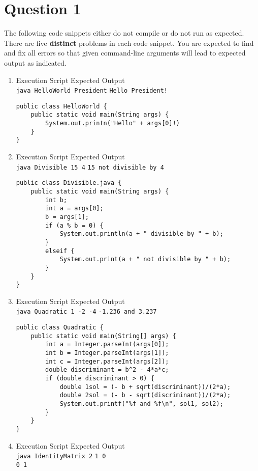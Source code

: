 \section*{Question 1}
The following code snippets either do not compile or do not run as expected. There are five \textbf{distinct} problems in each code snippet. You are expected to find and fix all errors so that given command-line arguments will lead to expected output as indicated.
\begin{enumerate}[label=\textbf{(\alph*)}]
\item Execution Script \hfill Expected Output\\
\texttt{java HelloWorld President} \hfill \texttt{Hello President!}
\begin{lstlisting}
public class HelloWorld {
	public static void main(String args) {
		System.out.printn("Hello" + args[0]!)
	}
}
\end{lstlisting}

\item Execution Script \hfill Expected Output\\
\texttt{java Divisible 15 4} \hfill \texttt{15 not divisible by 4}

\begin{lstlisting}
public class Divisible.java {
	public static void main(String args) {
		int b;
		int a = args[0];
		b = args[1];
		if (a % b = 0) {
			System.out.println(a + " divisible by " + b);
		}
		elseif {
			System.out.print(a + " not divisible by " + b);
		}
	}
}
\end{lstlisting}

\item Execution Script \hfill Expected Output\\
\texttt{java Quadratic 1 -2 -4} \hfill \texttt{-1.236 and 3.237}

\begin{lstlisting}
public class Quadratic {
	public static void main(String[] args) {
		int a = Integer.parseInt(args[0]);
		int b = Integer.parseInt(args[1]);
		int c = Integer.parseInt(args[2]);
		double discriminant = b^2 - 4*a*c;
		if (double discriminant > 0) {
			double 1sol = (- b + sqrt(discriminant))/(2*a);
			double 2sol = (- b - sqrt(discriminant))/(2*a);
			System.out.printf("%f and %f\n", sol1, sol2);
		}
	}
}
\end{lstlisting}

\item Execution Script \hfill Expected Output\\
\texttt{java IdentityMatrix 2} \hfill \texttt{1 0}\\ \raggedleft \texttt{0 1}


\end{enumerate}

